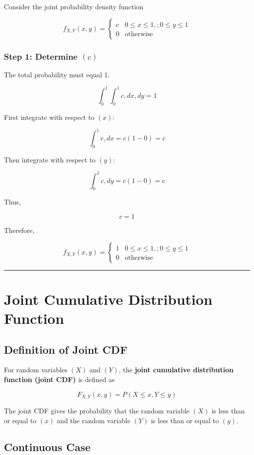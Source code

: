 \documentclass[12pt]{article}
\begin{document}
Consider the joint probability density function

\[
f_{X,Y}(x,y)=
\begin{cases}
c & 0 \le x \le 1,; 0 \le y \le 1 \\
0 & \text{otherwise}
\end{cases}
\]

\subsubsection*{Step 1: Determine $(c)$}

The total probability must equal 1.

\[
\int_0^1 \int_0^1 c,dx,dy = 1
\]

First integrate with respect to $(x)$:

\[
\int_0^1 c,dx = c(1-0) = c
\]

Then integrate with respect to $(y)$:

\[
\int_0^1 c,dy = c(1-0) = c
\]

Thus,

\[
c = 1
\]

Therefore,

\[
f_{X,Y}(x,y)=
\begin{cases}
1 & 0 \le x \le 1,; 0 \le y \le 1 \\
0 & \text{otherwise}
\end{cases}
\]

\hrule
\vspace{0.5cm}

\section*{Joint Cumulative Distribution Function}

\subsection*{Definition of Joint CDF}

For random variables $(X)$ and $(Y)$, the \textbf{joint cumulative distribution function (joint CDF)} is defined as

\[
F_{X,Y}(x,y) = P(X \le x, Y \le y)
\]

The joint CDF gives the probability that the random variable $(X)$ is less than or equal to $(x)$ and the random variable $(Y)$ is less than or equal to $(y)$.

\subsection*{Continuous Case}
\end{document}

